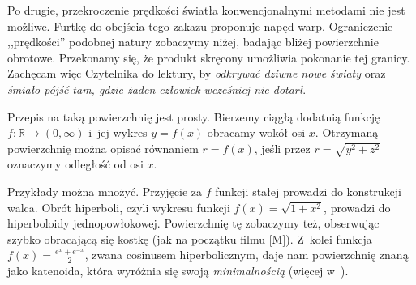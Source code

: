 Po drugie, przekroczenie prędkości światła konwencjonalnymi metodami nie jest możliwe. Furtkę do obejścia tego zakazu proponuje napęd warp. Ograniczenie ,,prędkości'' podobnej natury zobaczymy niżej, badając bliżej powierzchnie obrotowe. Przekonamy się, że produkt skręcony umożliwia pokonanie tej granicy. Zachęcam więc Czytelnika do lektury, by \emph{odkrywać dziwne nowe światy} oraz \emph{śmiało pójść tam, gdzie żaden człowiek wcześniej nie dotarł}. 

 Przepis na taką powierzchnię jest prosty. 
Bierzemy ciągłą dodatnią funkcję $f \colon \mathbb R \to (0,\infty)$ i~jej wykres $y = f(x)$ obracamy wokół osi $x$. Otrzymaną powierzchnię można opisać równaniem $r = f(x)$, jeśli przez $r = \sqrt{y^2+z^2}$ oznaczymy odległość od osi $x$. 

Przykłady można mnożyć. Przyjęcie za $f$ funkcji stałej prowadzi do konstrukcji walca. Obrót hiperboli, czyli wykresu funkcji $f(x) = \sqrt{1+x^2}$, prowadzi do hiperboloidy jednopowłokowej. 
Powierzchnię tę zobaczymy też, obserwując szybko obracającą się kostkę (jak na początku filmu \href{https://youtu.be/G0Fa5Zl-Z3c?si=5dBKqRu1GoBDStEi&t=110}{[M]}). Z~kolei funkcja $f(x) = \frac{e^x+e^{-x}}{2}$, zwana cosinusem hiperbolicznym, daje nam powierzchnię znaną jako katenoida, która wyróżnia się swoją \emph{minimalnością} (więcej w~). 

